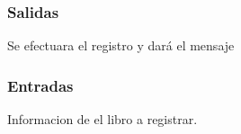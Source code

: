 
\subsubsection{Salidas}
	\begin{Citemize}
		\item Se efectuara el registro y dará el mensaje  
	\end{Citemize}
	
\subsubsection{Entradas}
	\begin{Citemize}
		\item Informacion de el libro a registrar.
	\end{Citemize}
